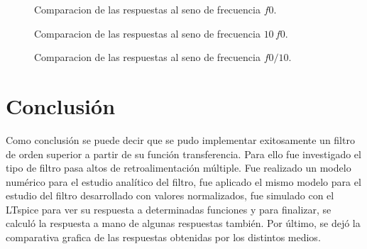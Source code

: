 \documentclass[10pt,a4paper]{article}
\begin{document}
    \begin{figure}[H]
        \centering
        \scalebox{0.85}{}
        \caption{Comparacion de las respuestas al seno de frecuencia $f0$.}
        \label{fig}
    \end{figure}

    \begin{figure}[H]
        \centering
        \scalebox{0.85}{}
        \caption{Comparacion de las respuestas al seno de frecuencia $10\, f0$.}
        \label{fig}
    \end{figure}

    \begin{figure}[H]
        \centering
        \scalebox{0.85}{}
        \caption{Comparacion de las respuestas al seno de frecuencia $f0/10$.}
        \label{fig}
    \end{figure}


    \section{Conclusión}\label{sec:conclusión}
    Como conclusión se puede decir que se pudo implementar exitosamente un filtro de orden superior a partir de su función transferencia. Para ello fue investigado el tipo de filtro pasa altos de retroalimentación múltiple. Fue realizado un modelo numérico para el estudio analítico del filtro, fue aplicado el mismo modelo para el estudio del filtro desarrollado con valores normalizados, fue simulado con el LTspice para ver su respuesta a determinadas funciones y para finalizar, se calculó la respuesta a mano de algunas respuestas también.
    Por último, se dejó la comparativa grafica de las respuestas obtenidas por los distintos medios.
\end{document}
